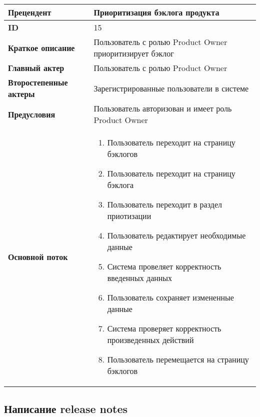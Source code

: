 \documentclass[14pt,a4paper]{extarticle}
\begin{document}
\begin{tabular}{|l|p{9cm}|}
	\hline
	\textbf{Прецендент}            & Приоритизация бэклога продукта                                               \\
	\hline
	\textbf{ID}                    & 15                                                                           \\
	\hline
	\textbf{Краткое описание}      & Пользователь с ролью Product Owner приоритизирует бэклог                     \\
	\hline
	\textbf{Главный актер}         & Пользователь с ролью Product Owner                                           \\
	\hline
	\textbf{Второстепенные актеры} & Зарегистрированные пользователи в системе                                    \\
	\hline
	\textbf{Предусловия}           & Пользователь авторизован и имеет роль Product Owner                          \\
	\hline
	\textbf{Основной поток}        & \begin{enumerate}
		                                 \item Пользователь переходит на страницу бэклогов
		                                 \item Пользователь переходит на страницу бэклога
						 \item Пользователь переходит в раздел приотизации
					         \item Пользователь редактирует необходимые данные
						 \item Система провеляет корректность введенных данных
					         \item Пользователь сохраняет измененные данные
		                                 \item Система проверяет корректность произведенных действий
						 \item Пользователь перемещается на страницу бэклогов
	                                 \end{enumerate} \\
	\hline
\end{tabular}

\subsection{Написание release notes}
\end{document}

